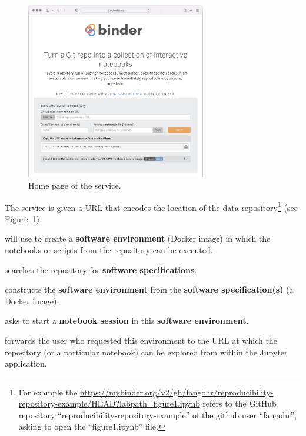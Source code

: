 \begin{figure}[ht]
  \centering
    \includegraphics[width=0.7\textwidth]{images/mybinder.png}
    \caption{Home page of the \mybinder{} service.}
    \label{fig:mybinder-homepage}
\end{figure}

\begin{compactitem}
\item The \binderhub{} service is given a URL that encodes the location of the data
  repository\footnote{For example the
    {\url{https://mybinder.org/v2/gh/fangohr/reproducibility-repository-example/HEAD?labpath=figure1.ipynb}}
    refers to the GitHub repository ``reproducibility-repository-example'' of the
    github user ``fangohr'', asking to open the ``figure1.ipynb'' file.}
  (see Figure~\ref{fig:mybinder-homepage})
\item \binderhub{} will use
  \repotodocker{} to create a \textbf{software environment} (Docker image)
  in which the notebooks or scripts from the repository can be executed.
\item \repotodocker{} searches the repository for \textbf{software specifications}.
\item \repotodocker{} constructs the \textbf{software environment}
  from the \textbf{software specification(s)} (a Docker image).
\item \binderhub{} asks \JupyterHub to start
  a \textbf{notebook session} in this \textbf{software environment}.
\item \binderhub{} forwards the user who requested this environment to
  the URL at which the repository (or a particular notebook) can be explored
  from within the Jupyter application.
\end{compactitem}


